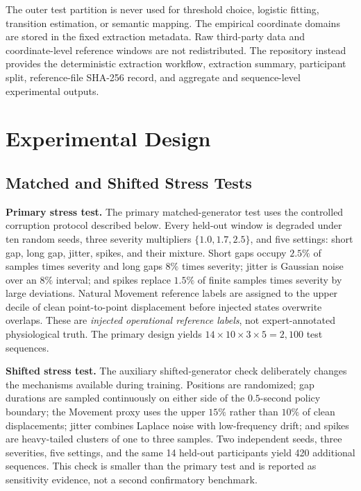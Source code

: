 \documentclass[sigconf,review]{acmart}
\begin{document}
The outer test partition is never used for threshold choice, logistic fitting, transition estimation, or semantic mapping. The empirical coordinate domains are stored in the fixed extraction metadata. Raw third-party data and coordinate-level reference windows are not redistributed. The repository instead provides the deterministic extraction workflow, extraction summary, participant split, reference-file SHA-256 record, and aggregate and sequence-level experimental outputs.

\section{Experimental Design}
\label{sec:experiments}

\subsection{Matched and Shifted Stress Tests}

\textbf{Primary stress test.} The primary matched-generator test uses the controlled corruption protocol described below. Every held-out window is degraded under ten random seeds, three severity multipliers $\{1.0,1.7,2.5\}$, and five settings: short gap, long gap, jitter, spikes, and their mixture. Short gaps occupy $2.5\%$ of samples times severity and long gaps $8\%$ times severity; jitter is Gaussian noise over an $8\%$ interval; and spikes replace $1.5\%$ of finite samples times severity by large deviations. Natural Movement reference labels are assigned to the upper decile of clean point-to-point displacement before injected states overwrite overlaps. These are \emph{injected operational reference labels}, not expert-annotated physiological truth. The primary design yields $14\times10\times3\times5=2{,}100$ test sequences.

\textbf{Shifted stress test.} The auxiliary shifted-generator check deliberately changes the mechanisms available during training. Positions are randomized; gap durations are sampled continuously on either side of the $0.5$-second policy boundary; the Movement proxy uses the upper $15\%$ rather than $10\%$ of clean displacements; jitter combines Laplace noise with low-frequency drift; and spikes are heavy-tailed clusters of one to three samples. Two independent seeds, three severities, five settings, and the same 14 held-out participants yield 420 additional sequences. This check is smaller than the primary test and is reported as sensitivity evidence, not a second confirmatory benchmark.
\end{document}
